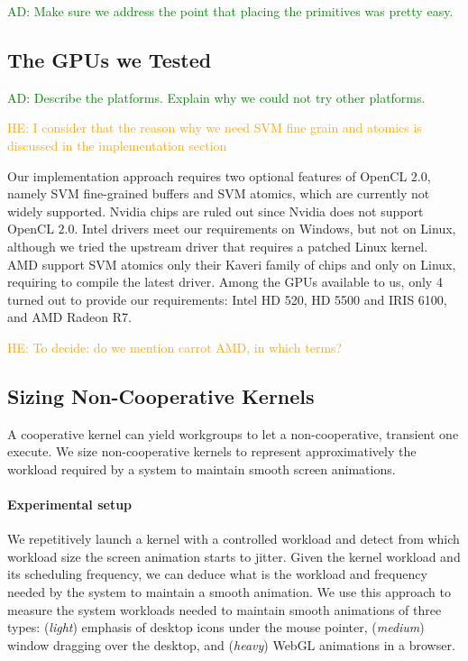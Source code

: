 \documentclass[numbers,nocopyrightspace,10pt]{sigplanconf}
\newcommand{\ADComment}[1]{\textcolor{green}{AD: #1}}
\newcommand{\HEComment}[1]{\textcolor{orange}{HE: #1}}
\newcommand{\nvidia}{Nvidia\xspace}
\begin{document}
\ADComment{Make sure we address the point that placing the primitives was pretty easy.}

\subsection{The GPUs we Tested}

\ADComment{Describe the platforms.  Explain why we could not try other
platforms.}

\HEComment{I consider that the reason why we need SVM fine grain and
  atomics is discussed in the implementation section}

Our implementation approach requires two optional features of OpenCL
$2.0$, namely SVM fine-grained buffers and SVM atomics, which are
currently not widely supported. \nvidia chips are ruled out since
\nvidia does not support OpenCL $2.0$. Intel drivers meet our
requirements on Windows, but not on Linux, although we tried the
upstream driver that requires a patched Linux kernel. AMD support SVM
atomics only their Kaveri family of chips and only on Linux, requiring
to compile the latest driver. Among the GPUs available to us, only 4
turned out to provide our requirements: Intel HD 520, HD 5500 and IRIS
6100, and AMD Radeon R7.

\HEComment{To decide: do we mention carrot AMD, in which terms?}

\subsection{Sizing Non-Cooperative Kernels}\label{sec:sizingnoncoop}

A cooperative kernel can yield workgroups to let a non-cooperative,
transient one execute. We size non-cooperative kernels to represent
approximatively the workload required by a system to maintain smooth
screen animations.

\paragraph{Experimental setup} We repetitively launch a kernel with a
controlled workload and detect from which workload size the screen
animation starts to jitter. Given the kernel workload and its
scheduling frequency, we can deduce what is the workload and frequency
needed by the system to maintain a smooth animation. We use this
approach to measure the system workloads needed to maintain smooth
animations of three types: (\emph{light}) emphasis of desktop icons
under the mouse pointer, (\emph{medium}) window dragging over the
desktop, and (\emph{heavy}) WebGL animations in a browser.
\end{document}
